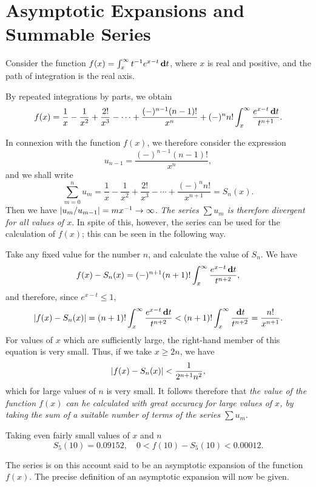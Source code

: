 %
%
\chapter{Asymptotic Expansions and Summable Series}


Consider the function $f(x) = \int_{x}^{\infty} t^{-1} e^{x-t}
\, \mathbf{d} t$, where $x$ is real and positive, and the path of
integration is the real axis.

By repeated integrations by parts, we obtain
$$
f(x) = \frac{1}{x} - \frac{1}{x^{2}} + \frac{2!}{x^{3}} - \cdots +
\frac{ (-)^{n-1} (n-1)!}{x^{n}} + (-)^{n} n! \int_{x}^{\infty}
\frac{e^{x-t} \, \mathbf{d} t}{t^{n+1}}.
$$

In connexion with the function $f(x)$, we therefore consider the
expression
$$
u_{n-1} = \frac{ (-)^{n-1} (n-1)!}{x^{n}},
$$
and we shall write
$$
\sum_{m=0}^{n} u_{m} = \frac{1}{x} - \frac{1}{x^{2}} +
\frac{2!}{x^{3}} - \cdots + \frac{ (-)^{n} n!}{x^{n+1}} = S_{n}(x).
$$
Then we have $\left| u_{m}/u_{m-1} \right| = mx^{-1} \rightarrow \infty$.
\emph{The series $\sum u_{m}$ is therefore divergent for all values of
$x$}. In spite of this, however, the series can be used for the
calculation of $f(x)$; this can be seen in the following way.

Take any fixed value for the number $n$, and calculate the value of
$S_{n}$. We have
$$
f(x) - S_{n}(x) = (-)^{n+1} (n+1)! \int_{x}^{\infty} \frac{e^{x-t}
\, \mathbf{d} t}{t^{n+2}},
$$
and therefore, since $e^{x-t} \leq 1$,
$$
\left|  f(x) - S_{n}(x)  \right| = (n+1)! \int_{x}^{\infty} \frac{e^{x-t}
\, \mathbf{d} t}{t^{n+2}} < (n+1)! \int_{x}^{\infty} \frac{\, \mathbf{d}
t}{t^{n+2}} = \frac{n!}{x^{n+1}}.
$$
For values of $x$ which are sufficiently large, the right-hand member
of this equation is very small. Thus, if we take $x \geq 2n$, we have
$$
\left|  f(x) - S_{n}(x) \right| < \frac{1}{2^{n+1} n^{2}},
$$
which for large values of $n$ is very small. It follows therefore that
\emph{the value of the function $f(x)$ can he calculated with great
accuracy for large values of $x$, by taking the sum of a suitable
number of terms of the series $\sum u_{m}$}.

Taking even fairly small values of $x$ and $n$
$$
S_{5}(10) = 0.09152, \quad 0 < f(10) - S_{5}(10) < 0.00012.
$$
%
%

The series is on this account said to be an asymptotic expansion of
the function $f(x)$. The precise definition of an asymptotic expansion
will now be given.

